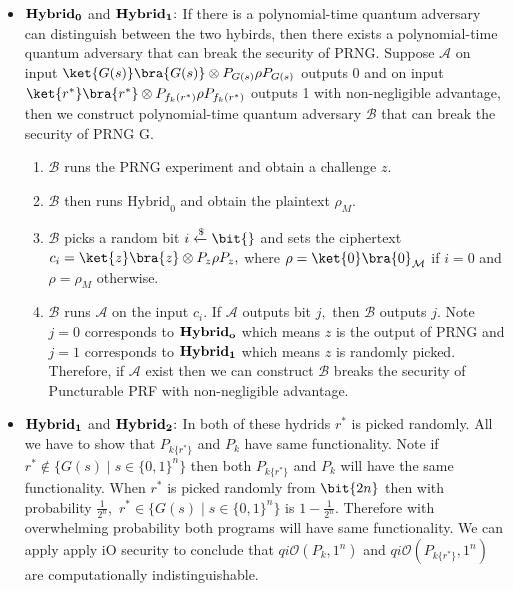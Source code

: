 \begin{itemize}
\item ${\bf Hybrid_0}$ and ${\bf Hybrid_1}\hspace{-0.09cm}:$ If there is a polynomial-time quantum adversary can distinguish between the two hybirds, then there exists a  polynomial-time quantum adversary that can break the security of PRNG. Suppose $\mathcal{A}$ on input  $\ket{G(s)}\bra{G(s)} \otimes P_{G(s)} \rho P_{G(s)}$  outputs 0 and on input $\ket{r^*}\bra{r^*} \otimes P_{f_k(r^*)} \rho P_{f_k(r^*)}$  outputs 1 with non-negligible advantage, then we construct polynomial-time quantum adversary $\mathcal{B}$ that can break the security of PRNG G.

 \begin{enumerate}
\item $\mathcal{B}$ runs the PRNG experiment and obtain a challenge $z.$
\item $\mathcal{B}$ then runs  $\mbox{Hybrid}_0$ and obtain the plaintext $\rho_M.$
\item $\mathcal{B}$ picks a random bit $i \xleftarrow[]{\$} \bit{}$ and sets the ciphertext $c_i=\ket{z}\bra{z} \otimes P_z \rho P_z,$ where $\rho=\ket{0}\bra{0}_\mathcal{M}$ if $i=0$ and  $\rho=\rho_M$ otherwise.
\item  $\mathcal{B}$ runs $\mathcal{A}$ on the input $c_i.$ If $\mathcal{A}$ outputs bit $j,$ then $\mathcal{B}$ outputs $j.$ Note $j=0$ corresponds to ${\bf Hybrid_o}$ which means $z$ is the output of PRNG and $j=1$ corresponds to ${\bf Hybrid_1}$ which means $z$ is randomly picked. Therefore, if $\mathcal{A}$ exist then we can construct $\mathcal{B}$ breaks the security of Puncturable PRF with non-negligible advantage.
\end{enumerate}
\end{itemize}




\begin{itemize}
\item ${\bf Hybrid_1}$ and ${\bf Hybrid_2}\hspace{-0.09cm}:$ In both of these hydrids $r^*$ is picked randomly. All we have to show that  $P_{k\{r^*\}}$ and $P_{k}$ have same functionality. Note if $r^*\notin \{G(s) \mid s\in \{0,1\}^n\}$ then both $P_{k\{r^*\}}$ and $P_{k}$ will have the same functionality. When $r^*$ is picked randomly from $\bit{2n}$ then with probability $\frac{1}{2^n},$  $r^*\in \{G(s) \mid s\in \{0,1\}^n\}$ is $1-\frac{1}{2^n}.$ Therefore with overwhelming probability both programs will have same functionality. We can apply apply iO security to conclude that $qi\mathcal{O}(P_k,1^n)$ and $qi\mathcal{O}(P_{k\{r^*\}},1^n)$ are computationally indistinguishable.
\end{itemize}


